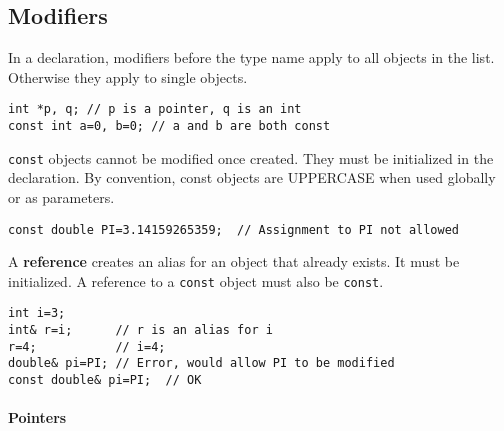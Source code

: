 	
	\subsection{Modifiers} %
		
		In a declaration, modifiers before the type name apply to all objects in the list. Otherwise they apply to single objects.
		\begin{code}\begin{lstlisting}[style=list]
int *p, q; // p is a pointer, q is an int
const int a=0, b=0; // a and b are both const
		\end{lstlisting}\end{code}
		
		\lstinline!const! objects cannot be modified once created. They must be initialized in the declaration. By convention, const objects are UPPERCASE when used globally or as parameters.
		\begin{code}\begin{lstlisting}[style=list]
const double PI=3.14159265359;  // Assignment to PI not allowed
		\end{lstlisting}\end{code}
		
		A \textbf{reference} creates an alias for an object that already exists. It must be initialized. A reference to a \lstinline!const! object must also be \lstinline!const!.
		\begin{code}\begin{lstlisting}[style=list]
int i=3;
int& r=i;      // r is an alias for i
r=4;           // i=4;
double& pi=PI; // Error, would allow PI to be modified
const double& pi=PI;  // OK
		\end{lstlisting}\end{code}
		
		\paragraph{Pointers} %
			
